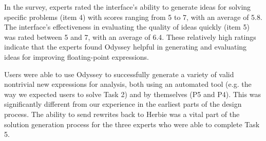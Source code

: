 
In the survey, experts rated the interface's ability to generate ideas for
solving specific problems (item 4) with scores ranging from 5 to 7, with an
average of 5.8. The interface's effectiveness in evaluating the quality of ideas
quickly (item 5) was rated between 5 and 7, with an average of 6.4. These
relatively high ratings indicate that the experts found Odyssey helpful in
generating and evaluating ideas for improving floating-point expressions.

Users were able to use Odyssey to successfully generate 
  a variety of valid nontrivial new expressions for analysis, 
  both using an automated tool 
  (e.g. the way we expected users to solve Task 2) 
  and by themselves (P5 and P4). This was significantly different from our experience 
  in the earliest parts of the design process.
  The ability to send rewrites back to Herbie was a vital
  part of the solution generation process for the three experts who were able to complete Task 5.



